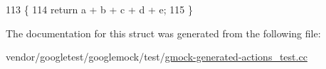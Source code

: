\begin{DoxyCode}
113                                                     \{
114     \textcolor{keywordflow}{return} a + b + c + d + e;
115   \}
\end{DoxyCode}


The documentation for this struct was generated from the following file\+:\begin{DoxyCompactItemize}
\item 
vendor/googletest/googlemock/test/\hyperlink{gmock-generated-actions__test_8cc}{gmock-\/generated-\/actions\+\_\+test.\+cc}\end{DoxyCompactItemize}
